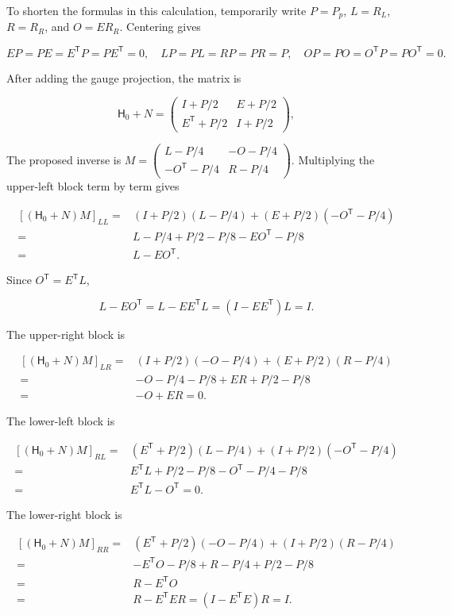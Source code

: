 \documentclass[11pt,a4paper]{article}
\begin{document}
To shorten the formulas in this calculation, temporarily write \(P=P_p\), \(L=R_L\), \(R=R_R\), and \(O=ER_R\). Centering gives

\[
EP=PE=E^{\mathsf T}P=PE^{\mathsf T}=0,\quad
LP=PL=RP=PR=P,\quad OP=PO=O^{\mathsf T}P=PO^{\mathsf T}=0.
\]

After adding the gauge projection, the matrix is

\[
\mathsf H_0+N=\begin{pmatrix}I+P/2&E+P/2\\E^{\mathsf T}+P/2&I+P/2\end{pmatrix},
\]

The proposed inverse is \(M=\left(\begin{smallmatrix}L-P/4&-O-P/4\\-O^{\mathsf T}-P/4&R-P/4\end{smallmatrix}\right)\). Multiplying the upper-left block term by term gives

\[
\begin{aligned}
[(\mathsf H_0+N)M]_{LL}
={}&(I+P/2)(L-P/4)+(E+P/2)(-O^{\mathsf T}-P/4)\\
={}&L-P/4+P/2-P/8-EO^{\mathsf T}-P/8\\
={}&L-EO^{\mathsf T}.
\end{aligned}
\]

Since \(O^{\mathsf T}=E^{\mathsf T}L\),

\[
L-EO^{\mathsf T}=L-EE^{\mathsf T}L=(I-EE^{\mathsf T})L=I.
\]

The upper-right block is

\[
\begin{aligned}
[(\mathsf H_0+N)M]_{LR}
={}&(I+P/2)(-O-P/4)+(E+P/2)(R-P/4)\\
={}&-O-P/4-P/8+ER+P/2-P/8\\
={}&-O+ER=0.
\end{aligned}
\]

The lower-left block is

\[
\begin{aligned}
[(\mathsf H_0+N)M]_{RL}
={}&(E^{\mathsf T}+P/2)(L-P/4)+(I+P/2)(-O^{\mathsf T}-P/4)\\
={}&E^{\mathsf T}L+P/2-P/8-O^{\mathsf T}-P/4-P/8\\
={}&E^{\mathsf T}L-O^{\mathsf T}=0.
\end{aligned}
\]

The lower-right block is

\[
\begin{aligned}
[(\mathsf H_0+N)M]_{RR}
={}&(E^{\mathsf T}+P/2)(-O-P/4)+(I+P/2)(R-P/4)\\
={}&-E^{\mathsf T}O-P/8+R-P/4+P/2-P/8\\
={}&R-E^{\mathsf T}O\\
={}&R-E^{\mathsf T}ER=(I-E^{\mathsf T}E)R=I.
\end{aligned}
\]
\end{document}
